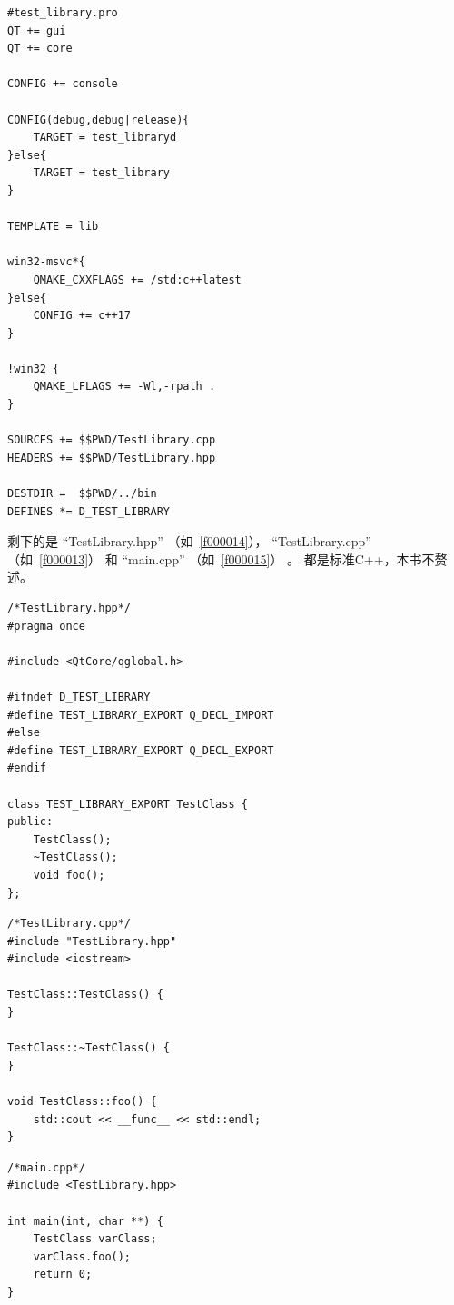 \FloatBarrier
\begin{lstlisting}[label=f000012,
caption=GoodLuck,
title=\lstlistingname\ \thelstlisting
]
#test_library.pro
QT += gui
QT += core

CONFIG += console

CONFIG(debug,debug|release){
    TARGET = test_libraryd
}else{
    TARGET = test_library
}

TEMPLATE = lib

win32-msvc*{
    QMAKE_CXXFLAGS += /std:c++latest
}else{
    CONFIG += c++17
}

!win32 {
    QMAKE_LFLAGS += -Wl,-rpath .
}

SOURCES += $$PWD/TestLibrary.cpp
HEADERS += $$PWD/TestLibrary.hpp

DESTDIR =  $$PWD/../bin
DEFINES *= D_TEST_LIBRARY
\end{lstlisting}          %


剩下的是
“TestLibrary.hpp”
（如\lstlistingname\ \ref{f000014}），
“TestLibrary.cpp”
（如\lstlistingname\ \ref{f000013}）
和
“main.cpp”
（如\lstlistingname\ \ref{f000015}）
。
都是标准C{\sourcefonttwo{}+}{\sourcefonttwo{}+}，本书不赘述。
\FloatBarrier
\begin{lstlisting}[label=f000014,
caption=GoodLuck,
title=\lstlistingname\ \thelstlisting
]
/*TestLibrary.hpp*/
#pragma once

#include <QtCore/qglobal.h>

#ifndef D_TEST_LIBRARY
#define TEST_LIBRARY_EXPORT Q_DECL_IMPORT
#else
#define TEST_LIBRARY_EXPORT Q_DECL_EXPORT
#endif

class TEST_LIBRARY_EXPORT TestClass {
public:
    TestClass();
    ~TestClass();
    void foo();
};
\end{lstlisting}          %
\FloatBarrier
\begin{lstlisting}[label=f000013,
caption=GoodLuck,
title=\lstlistingname\ \thelstlisting
]
/*TestLibrary.cpp*/
#include "TestLibrary.hpp"
#include <iostream>

TestClass::TestClass() {
}

TestClass::~TestClass() {
}

void TestClass::foo() {
    std::cout << __func__ << std::endl;
}
\end{lstlisting}          %
\FloatBarrier
\begin{lstlisting}[label=f000015,
caption=GoodLuck,
title=\lstlistingname\ \thelstlisting
]
/*main.cpp*/
#include <TestLibrary.hpp>

int main(int, char **) {
    TestClass varClass;
    varClass.foo();
    return 0;
}
\end{lstlisting}          %


